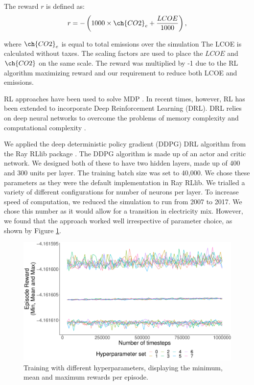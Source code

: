 \documentclass{article}
\begin{document}
The reward $r$ is defined as:
\begin{equation}
\label{eq:reward_function}
	r = -\left(1000\times\ch{CO2}_e + \frac{LCOE}{1000}\right),
\end{equation}

where $\ch{CO2}_e$ is equal to total  emissions over the simulation The LCOE is calculated without taxes. The scaling factors are used to place the $LCOE$ and $\ch{CO2}$ on the same scale. The reward was multiplied by -1 due to the RL algorithm maximizing reward and our requirement to reduce both LCOE and  emissions.


RL approaches have been used to solve MDP \cite{Sutton2015}. In recent times, however, RL has been extended to incorporate Deep Reinforcement Learning (DRL). DRL relies on deep neural networks to overcome the problems of memory complexity and computational complexity \cite{Arulkumaran2017}. 

We applied the deep deterministic policy gradient (DDPG) DRL algorithm \cite{Hunt2016a} from the Ray RLlib package \cite{Liang2014}. The DDPG algorithm is made up of an actor and critic network. We designed both of these to have two hidden layers, made up of 400 and 300 units per layer. The training batch size was set to 40,000. We chose these parameters as they were the default implementation in Ray RLlib. We trialled a variety of different configurations for number of neurons per layer. To increase speed of computation, we reduced the simulation to run from 2007 to 2017. We chose this number as it would allow for a transition in electricity mix. However, we found that the approach worked well irrespective of parameter choice, as shown by Figure \ref{fig:hyperparameter_training}. 





\begin{figure}
\centering
\includegraphics[width=0.7\columnwidth]{figures/hyperparameter_training.pdf}
\caption{Training with different hyperparameters, displaying the minimum, mean and maximum rewards per episode.}
\label{fig:hyperparameter_training}
\end{figure}
\end{document}
